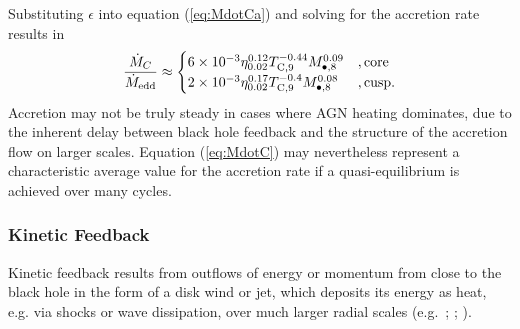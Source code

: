 \documentclass[usenatbib,fleqn]{mn2e}
\begin{document}
Substituting $\epsilon$ into equation (\ref{eq:MdotCa}) and solving for the accretion rate results in
\begin{align}
\frac{\dot{M}_{C}}{\dot{M}_{\rm edd}} \approx 
\begin{cases} 6\times 10^{-3} \eta_{0.02}^{0.12}T_{\rm
C,9}^{-0.44}M_{\bullet,8}^{0.09}
&, \text{core}\\ 2\times 10^{-3} \eta_{0.02}^{0.17}T_{\rm
C,9}^{-0.4} M_{\bullet,8}^{0.08}
&, \text{cusp}.
  \end{cases}
  \label{eq:MdotC}
\end{align}
Accretion may not be truly steady in cases where AGN
heating dominates, due to the inherent delay between black hole
feedback and the structure of the accretion flow on larger scales.
Equation (\ref{eq:MdotC}) may nevertheless
represent a characteristic average value for the accretion rate if a quasi-equilibrium is achieved over many cycles.


\subsubsection{Kinetic Feedback}

Kinetic feedback results from outflows of energy or momentum from
close to the black hole in the form of a disk wind or jet, which
deposits its energy as heat, e.g. via shocks or wave dissipation, over
much larger radial scales (e.g.~\citealt{McNamara&Nulsen07};
\citealt{Novak+11}; \citealt{Gaspari+12}).
\end{document}
